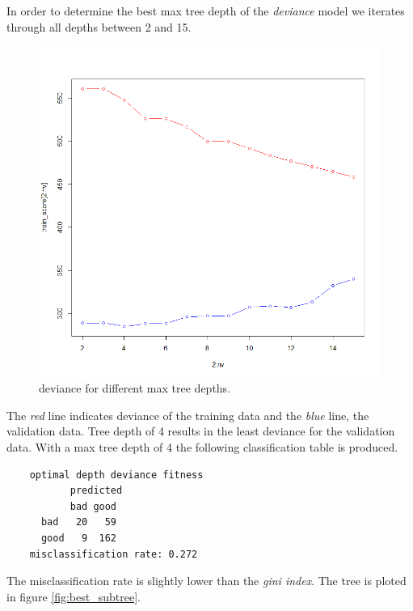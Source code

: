 \documentclass[a4paper, twocolumn]{article}
\begin{document}
	In order to determine the best max tree depth of the \textit{deviance} model we iterates through all depths between 2 and 15.
	\begin{figure}
	\centering
	\begin{minipage}[]{0.3\textwidth}
	  \includegraphics[width=\textwidth]{share/depth_tree.png}  
	  \caption{deviance for different max tree depths.\label{fig:tree_depth}}
	 \end{minipage}
	\end{figure}
	The \textit{red} line indicates deviance of the training data and the \textit{blue} line, the validation data. Tree depth of 4 results in the least deviance for the validation data. With a max tree depth of 4 the following classification table is produced.
	\begin{verbatim}
	optimal depth deviance fitness
	       predicted
	       bad good
	  bad   20   59
	  good   9  162
	misclassification rate: 0.272
	\end{verbatim}
	The misclassification rate is slightly lower than the \textit{gini index}. The tree is ploted in figure \ref{fig:best_subtree}.
\end{document}
